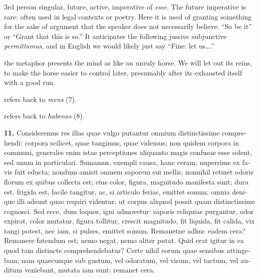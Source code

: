  3rd person singular, future, active, imperative of \textit{esse}. The future imperative is rare: often used in legal contexts or poetry. Here it is used of granting something for the sake of argument that the speaker does not necessarily believe: ``So be it'' or ``Grant that this is so.'' It anticipates the following jussive subjunctive \textit{permittamus}, and in English we would likely just say ``Fine: let us\dots.''

 the metaphor presents the mind as like an unruly horse. We will let out its reins, to make the horse easier to control later, presumably after its exhausted itself with a good run.

 refers back to \textit{mens} (7).

 refers back to \textit{habenas} (8).

\clearpage

\beginnumbering
\pstart
\begin{latin}
    \textenglish{\textbf{11.}} Consideremus res illas quae vulgo putantur omnium distinctissime comprehendi: corpora scilicet, quae tangimus, quae videmus; non quidem corpora in communi, generales enim istae perceptiones aliquanto magis confusae esse solent, sed unum in particulari. Sumamus, exempli causa, hanc ceram: nuperrime ex favis fuit educta; nondum amisit omnem saporem sui mellis; nonnihil retinet odoris florum ex quibus collecta est; eius color, figura, magnitudo manifesta sunt; dura est, frigida est, facile tangitur, ac, si articulo ferias, emittet sonum; omnia denique illi adsunt quae requiri videntur, ut corpus aliquod possit quam distinctissime cognosci. Sed ecce, dum loquor, igni admovetur: saporis reliquiae purgantur, odor expirat, color mutatur, figura tollitur, crescit magnitudo, fit liquida, fit calida, vix tangi potest, nec iam, si pulses, emittet sonum. Remanetne adhuc eadem cera? Remanere fatendum est; nemo negat, nemo aliter putat. Quid erat igitur in ea quod tam distincte comprehendebatur? Certe nihil eorum quae sensibus attingebam; nam quaecunque sub gustum, vel odoratum, vel visum, vel tactum, vel auditum veniebant, mutata iam sunt: remanet cera.
\end{latin}
\pend
\endnumbering

\prenotes

